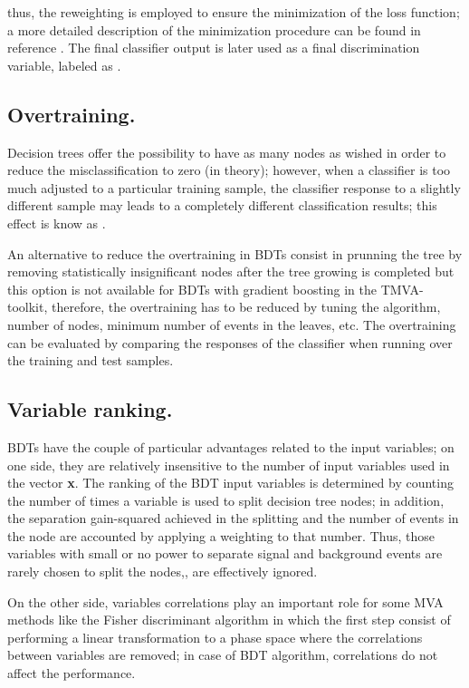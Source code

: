 \noindent thus, the reweighting is employed to ensure the minimization of the loss function; a more detailed description of the minimization procedure can be found in reference \cite{friedman}. The final classifier output is later used as a final discrimination variable, labeled as .

\subsection{Overtraining.}

Decision trees offer the possibility to have as many nodes as wished in order to reduce the misclassification to zero (in theory); however, when a classifier is too much adjusted to a particular training sample, the classifier response to a slightly different sample may leads to a completely different classification results; this effect is know as .

An alternative to reduce the overtraining in BDTs consist in prunning the tree by removing statistically insignificant nodes after the tree growing is completed but this option is not available for BDTs with gradient boosting in the TMVA-toolkit, therefore, the overtraining has to be reduced by tuning the algorithm, number of nodes, minimum number of events in the leaves, etc. The overtraining can be evaluated by comparing the responses of the classifier when running over the training and test samples.   

\subsection{Variable ranking.}

BDTs have the couple of particular advantages related to the input variables; on one side, they are relatively insensitive to the number of input variables used in the vector \textbf{x}. The ranking of the BDT input variables is determined by counting the number of times a variable is used to split decision tree nodes; in addition, the separation gain-squared achieved in the splitting and the number of events in the node are accounted by applying a weighting to that number. Thus, those variables with small or no power to separate signal and background events are rarely chosen to split the nodes,\ie, are effectively ignored.

On the other side, variables correlations play an important role for some MVA methods like the Fisher discriminant algorithm in which the first step consist of performing a linear transformation to a phase space where the correlations between variables are removed; in case of BDT algorithm, correlations do not affect the performance.


